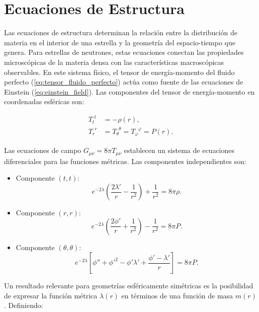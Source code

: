 \section{Ecuaciones de Estructura}

Las ecuaciones de estructura determinan la relación entre la distribución de materia en el interior de una estrella y la geometría del espacio-tiempo que genera. Para estrellas de neutrones, estas ecuaciones conectan las propiedades microscópicas de la materia densa con las características macroscópicas observables. En este sistema físico, el tensor de energía-momento del fluido perfecto (\ref{eq:tensor_fluido_perfecto}) actúa como fuente de las ecuaciones de Einstein (\ref{eq:einstein_field}). Las componentes del tensor de energía-momento en coordenadas esféricas son:

\begin{align}
	T_t^{\phantom{t}t} &= -\rho(r), \\
	T_r^{\phantom{r}r} &= T_\theta^{\phantom{\theta}\theta} = T_\varphi^{\phantom{\varphi}\varphi} = P(r).
\end{align}

Las ecuaciones de campo $G_{\mu\nu} = 8\pi T_{\mu\nu}$ establecen un sistema de ecuaciones diferenciales para las funciones métricas. Las componentes independientes son:

\begin{itemize}
	\item Componente $(t,t)$:
	\begin{equation}
		e^{-2\lambda}\left(\frac{2\lambda'}{r} - \frac{1}{r^2}\right) + \frac{1}{r^2} = 8\pi\rho.
		\label{eq:einstein_tt}
	\end{equation}
	\item Componente $(r,r)$:
	\begin{equation}
		e^{-2\lambda}\left(\frac{2\phi'}{r} + \frac{1}{r^2}\right) - \frac{1}{r^2} = 8\pi P.
		\label{eq:einstein_rr}
	\end{equation}
	\item Componente $(\theta,\theta)$:
	\begin{equation}
		e^{-2\lambda}\left[\phi'' + \phi'^2 - \phi'\lambda' + \frac{\phi' - \lambda'}{r}\right] = 8\pi P.
		\label{eq:einstein_theta}
	\end{equation}
\end{itemize}

Un resultado relevante para geometrías esféricamente simétricas es la posibilidad de expresar la función métrica $\lambda(r)$ en términos de una función de masa $m(r)$. Definiendo:

